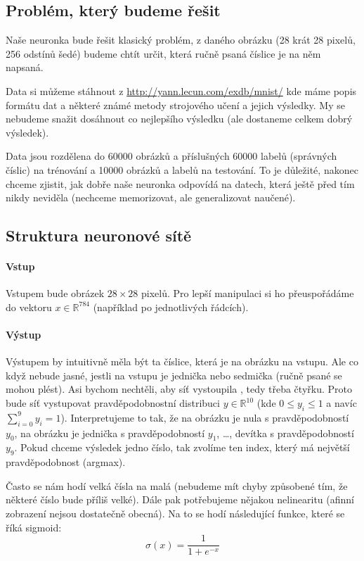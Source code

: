 \subsection{Problém, který budeme řešit}

Naše neuronka bude řešit klasický problém, z daného obrázku (28 krát 28 pixelů, 256 odstínů šedé) budeme chtít určit, která ručně psaná číslice je na něm napsaná.

Data si můžeme stáhnout z \url{http://yann.lecun.com/exdb/mnist/} kde máme popis formátu dat a některé známé metody strojového učení a jejich výsledky.
My se nebudeme snažit dosáhnout co nejlepšího výsledku (ale dostaneme celkem dobrý výsledek).

Data jsou rozdělena do 60000 obrázků a příslušných 60000 labelů (správných číslic) na trénování a 10000 obrázků a labelů na testování.
To je důležité, nakonec chceme zjistit, jak dobře naše neuronka odpovídá na datech, která ještě před tím nikdy neviděla (nechceme memorizovat, ale generalizovat naučené).

\subsection{Struktura neuronové sítě}

\paragraph{Vstup}
Vstupem bude obrázek $28 \times 28$ pixelů.
Pro lepší manipulaci si ho přeuspořádáme do vektoru $x \in \mathbb{R}^{784}$ (například po jednotlivých řádcích).

\paragraph{Výstup}
Výstupem by intuitivně měla být ta číslice, která je na obrázku na vstupu.
Ale co když nebude jasné, jestli na vstupu je jednička nebo sedmička (ručně psané se mohou plést).
Asi bychom nechtěli, aby síť vystoupila , tedy třeba čtyřku.
Proto bude síť vystupovat pravděpodobnostní distribuci $y \in \mathbb{R}^{10}$ (kde $0 \leq y_i \leq 1$ a navíc $\sum_{i = 0}^{9} y_i = 1$).
Interpretujeme to tak, že na obrázku je nula s pravděpodobností $y_0$, na obrázku je jednička s pravděpodobností $y_1$, \ldots, devítka s pravděpodobností $y_9$.
Pokud chceme výsledek jedno číslo, tak zvolíme ten index, který má největší pravděpodobnost (argmax).

Často se nám hodí  velká čísla na malá (nebudeme mít chyby způsobené tím, že některé číslo bude příliš velké).
Dále pak potřebujeme nějakou nelinearitu (afinní zobrazení nejsou dostatečně obecná).
Na to se hodí následující funkce, které se říká sigmoid:
$$\sigma(x) = \frac{1}{1 + e^{-x}}$$

